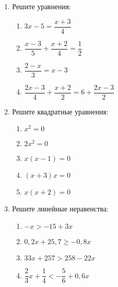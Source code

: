 \documentclass[12pt, a4paper]{article}
\begin{document}
	
	\begin{enumerate}
		\item Решите уравнения:
		\begin{multicols}{2}
			\begin{enumerate}[label=\asbuk*)]
			\item $3x-5=\dfrac{x+3}{4}$
			\item $\dfrac{x-3}{5}+\dfrac{x+2}{4}=\dfrac{1}{2}$
			\item $\dfrac{2-x}{3}=x-3$
			\item $\dfrac{2x-3}{4}+\dfrac{x+2}{2}=6+\dfrac{2x-3}{2}$
		\end{enumerate}
		\end{multicols}
	\item Решите квадратные уравнения:
			\begin{multicols}{2}
			\begin{enumerate}[label=\asbuk*)]
				\item $x^2=0$
				\item $2x^2=0$
				\item $x(x-1)=0$
				\item $(x+3)x=0$
				\item $x(x+2)=0$
			\end{enumerate}
		\end{multicols}
	\item Решите линейные неравенства:
	\begin{multicols}{2}
		\begin{enumerate}[label=\asbuk*)]
		\item $-x>-15+3x$
		\item $0,2x+25,7\geqslant-0,8x$
		\item $33x+257>258-22x$
		\item $\dfrac{2}{3}x+\dfrac{1}{4}<-\dfrac{5}{6}+0,6x$
		\end{enumerate}
	\end{multicols}
	\end{enumerate}
\end{document}

